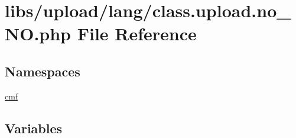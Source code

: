 \hypertarget{class_8upload_8no___n_o_8php}{}\section{libs/upload/lang/class.upload.\+no\+\_\+\+N\+O.\+php File Reference}
\label{class_8upload_8no___n_o_8php}
\subsection*{Namespaces}
\begin{DoxyCompactItemize}
\item 
 \hyperlink{namespacecmf}{cmf}
\end{DoxyCompactItemize}
\subsection*{Variables}
